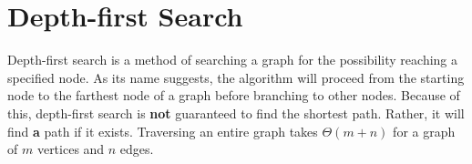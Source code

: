 \section{Depth-first Search}

Depth-first search is a method of searching a graph for the possibility reaching a specified node.
As its name suggests, the algorithm will proceed from the starting node to the farthest node of a graph before branching to other nodes.
Because of this, depth-first search is \textbf{not} guaranteed to find the shortest path.
Rather, it will find \textbf{a} path if it exists.
Traversing an entire graph takes $\Theta (m + n)$ for a graph of $m$ vertices and $n$ edges.
